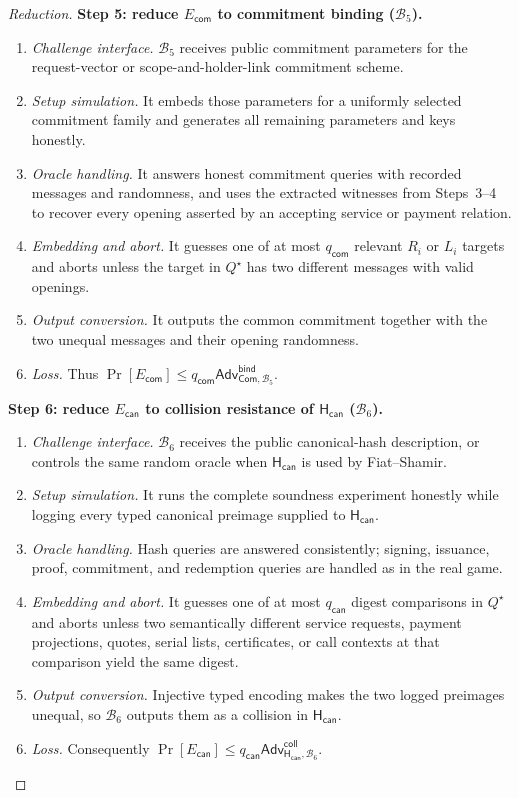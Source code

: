 \documentclass[letterpaper]{article}
\newcommand{\commit}{\mathsf{Com}}
\newcommand{\hash}{\mathsf{H}_{\mathsf{can}}}
\newcommand{\Adv}{\mathsf{Adv}}
\begin{document}
\begin{proof}[Reduction]
\textbf{Step 5: reduce \(E_{\mathsf{com}}\) to commitment binding
(\(\mathcal B_5\)).}
\begin{enumerate}
  \item \emph{Challenge interface.} \(\mathcal B_5\) receives public
  commitment parameters for the request-vector or scope-and-holder-link
  commitment scheme.
  \item \emph{Setup simulation.} It embeds those parameters for a uniformly
  selected commitment family and generates all remaining parameters and keys
  honestly.
  \item \emph{Oracle handling.} It answers honest commitment queries with
  recorded messages and randomness, and uses the extracted witnesses from
  Steps~3--4 to recover every opening asserted by an accepting service or
  payment relation.
  \item \emph{Embedding and abort.} It guesses one of at most
  \(q_{\mathsf{com}}\) relevant \(R_i\) or \(L_i\) targets and aborts unless the
  target in \(Q^\star\) has two different messages with valid openings.
  \item \emph{Output conversion.} It outputs the common commitment together
  with the two unequal messages and their opening randomness.
  \item \emph{Loss.} Thus
  \(\Pr[E_{\mathsf{com}}]\le
  q_{\mathsf{com}}\Adv^{\mathsf{bind}}_{\commit,\mathcal B_5}\).
\end{enumerate}

\textbf{Step 6: reduce \(E_{\mathsf{can}}\) to collision resistance of
\(\hash\) (\(\mathcal B_6\)).}
\begin{enumerate}
  \item \emph{Challenge interface.} \(\mathcal B_6\) receives the public
  canonical-hash description, or controls the same random oracle when \(\hash\)
  is used by Fiat--Shamir.
  \item \emph{Setup simulation.} It runs the complete soundness experiment
  honestly while logging every typed canonical preimage supplied to \(\hash\).
  \item \emph{Oracle handling.} Hash queries are answered consistently; signing,
  issuance, proof, commitment, and redemption queries are handled as in the
  real game.
  \item \emph{Embedding and abort.} It guesses one of at most
  \(q_{\mathsf{can}}\) digest comparisons in \(Q^\star\) and aborts unless two
  semantically different service requests, payment projections, quotes, serial
  lists, certificates, or call contexts at that comparison yield the
  same digest.
  \item \emph{Output conversion.} Injective typed encoding makes the two logged
  preimages unequal, so \(\mathcal B_6\) outputs them as a collision in
  \(\hash\).
  \item \emph{Loss.} Consequently
  \(\Pr[E_{\mathsf{can}}]\le
  q_{\mathsf{can}}\Adv^{\mathsf{coll}}_{\hash,\mathcal B_6}\).
\end{enumerate}


\end{proof}
\end{document}
